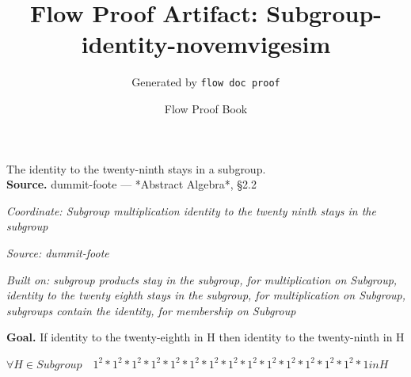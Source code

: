 \documentclass[11pt]{article}
\title{Flow Proof Artifact: Subgroup-identity-novemvigesim}
\author{Generated by \texttt{flow doc proof}}
\date{Flow Proof Book}
\theoremstyle{definition}
\begin{document}
\maketitle
The identity to the twenty-ninth stays in a subgroup.\\[0.5em]
\textbf{Source.} dummit-foote — *Abstract Algebra*, §2.2\\[0.5em]
\bigskip
{}\par
\smallskip\noindent\textit{Coordinate: Subgroup \cdot multiplication \cdot identity to the twenty ninth stays in the subgroup}\par
\smallskip\noindent\textit{Source: dummit-foote}\par
\smallskip\noindent\textit{Built on: subgroup products stay in the subgroup, for multiplication on Subgroup, identity to the twenty eighth stays in the subgroup, for multiplication on Subgroup, subgroups contain the identity, for membership on Subgroup}\par
\medskip
\noindent\textbf{Goal.} If identity to the twenty-eighth in H then identity to the twenty-ninth in H\par
\noindent$\displaystyle \forall H \in Subgroup\quad 1^{2} * 1^{2} * 1^{2} * 1^{2} * 1^{2} * 1^{2} * 1^{2} * 1^{2} * 1^{2} * 1^{2} * 1^{2} * 1^{2} * 1^{2} * 1^{2} * 1 in H$\par
\medskip
\noindent
\end{document}
